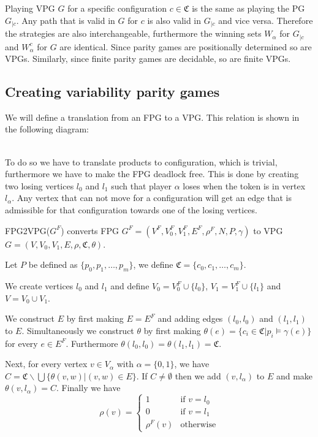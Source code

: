 Playing VPG $G$ for a specific configuration $c \in \mathfrak{C}$ is the same as playing the PG $G_{|c}$. Any path that is valid in $G$ for $c$ is also valid in $G_{|c}$ and vice versa. Therefore the strategies are also interchangeable, furthermore the winning sets $W_\alpha$ for $G_{|c}$ and $W_\alpha^c$ for $G$ are identical. Since parity games are positionally determined so are VPGs. Similarly, since finite parity games are decidable, so are finite VPGs.
\subsection{Creating variability parity games}
We will define a translation from an FPG to a VPG. This relation is shown in the following diagram:
\\\\
To do so we have to translate products to configuration, which is trivial, furthermore we have to make the FPG deadlock free. This is done by creating two losing vertices $l_0$ and $l_1$ such that player $\alpha$ loses when the token is in vertex $l_\alpha$. Any vertex that can not move for a configuration will get an edge that is admissible for that configuration towards one of the losing vertices.
\begin{definition}
	\label{def_FPG2VPG}
	FPG2VPG($G^F$) converts FPG $G^F = (V^F, V_0^F, V_1^F, E^F, \rho^F, N, P, \gamma)$ to VPG $G = (V, V_0, V_1, E, \rho, \mathfrak{C}, \theta)$.
	
	Let $P$ be defined as  $\{p_0, p_1, \dots, p_m\}$, we define $\mathfrak{C} = \{c_0, c_1, \dots, c_m\}$.
	
	We create vertices $l_0$ and $l_1$ and define $V_0 = V_0^F \cup \{l_0\}$, $V_1 = V_1^F \cup \{l_1\}$ and $V = V_0 \cup V_1$.
	
	We construct $E$ by first making $E = E^F$ and adding edges $(l_0, l_0)$ and $(l_1, l_1)$ to $E$. Simultaneously we construct $\theta$ by first making $\theta(e) = \{c_i \in \mathfrak{C} | p_i \models \gamma(e)\}$ for every $e \in E^F$. Furthermore $\theta(l_0,l_0) = \theta(l_1,l_1) = \mathfrak{C}$.
	
	Next, for every vertex $v \in V_\alpha$ with $\alpha = \{0,1\}$, we have $C = \mathfrak{C} \backslash \bigcup \{\theta(v,w)|(v,w) \in E\}$. If $C \neq \emptyset$ then we add $(v, l_\alpha)$ to $E$ and make $\theta(v,l_\alpha) = C$.
	Finally we have 
	\[ \rho(v) = \begin{cases}
	1  & \text{if } v = l_0 \\
	0 & \text{if } v = l_1 \\
	\rho^F(v) &\text{otherwise}
	\end{cases} \]
\end{definition}
